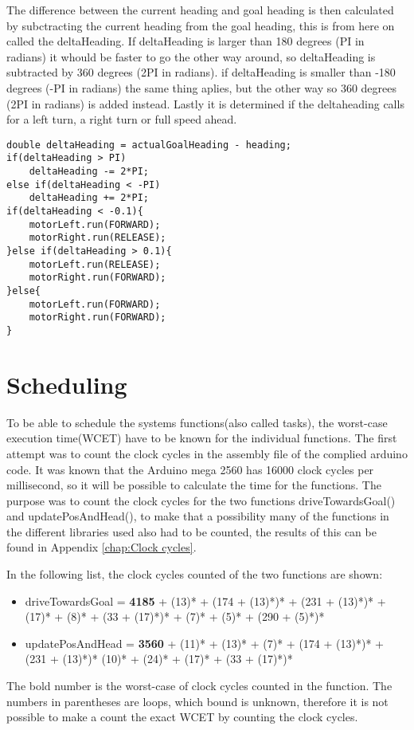 The difference between the current heading and goal heading is then calculated by subctracting the current heading from the goal heading, this is from here on called the deltaHeading. \newline
If deltaHeading is larger than 180 degrees (PI in radians) it whould be faster to go the other way around, so deltaHeading is subtracted by 360 degrees (2PI in radians). \newline
if deltaHeading is smaller than -180 degrees (-PI in radians) the same thing aplies, but the other way so 360 degrees (2PI in radians) is added instead. \newline
Lastly it is determined if the deltaheading calls for a left turn, a right turn or full speed ahead.

\begin{lstlisting}[caption={Check the difference of the actualGoalHeading and its current heading, and determines which motors to run}, label={lst:heading}]
double deltaHeading = actualGoalHeading - heading;
if(deltaHeading > PI)
	deltaHeading -= 2*PI;
else if(deltaHeading < -PI)
	deltaHeading += 2*PI;
if(deltaHeading < -0.1){
	motorLeft.run(FORWARD);
	motorRight.run(RELEASE);
}else if(deltaHeading > 0.1){
	motorLeft.run(RELEASE);
	motorRight.run(FORWARD);
}else{
	motorLeft.run(FORWARD);
	motorRight.run(FORWARD);
}
\end{lstlisting}

\section{Scheduling}
\label{sec:Scheduling implementation}
To be able to schedule the systems functions(also called tasks), the worst-case execution time(WCET) have to be known for the individual functions. The first attempt was to count the clock cycles in the assembly file of the complied arduino code. It was known that the Arduino mega 2560 has 16000 clock cycles per millisecond, so it will be possible to calculate the time for the functions. The purpose was to count the clock cycles for the two functions driveTowardsGoal() and updatePosAndHead(), to make that a possibility many of the functions in the different libraries used also had to be counted, the results of this can be found in Appendix \ref{chap:Clock cycles}.

In the following list, the clock cycles counted of the two functions are shown:
\begin{itemize}
	\item driveTowardsGoal = \textbf{4185} + (13)* + (174 + (13)*)* + (231 + (13)*)* + (17)* + (8)* + (33 + (17)*)* + (7)* + (5)* + (290 + (5)*)*
	\item updatePosAndHead = \textbf{3560} + (11)* + (13)* + (7)* + (174 + (13)*)* + (231 + (13)*)* (10)* + (24)* + (17)* + (33 + (17)*)*
\end{itemize}
The bold number is the worst-case of clock cycles counted in the function. The numbers in parentheses are loops, which bound is unknown, therefore it is not possible to make a count the exact WCET by counting the clock cycles.

